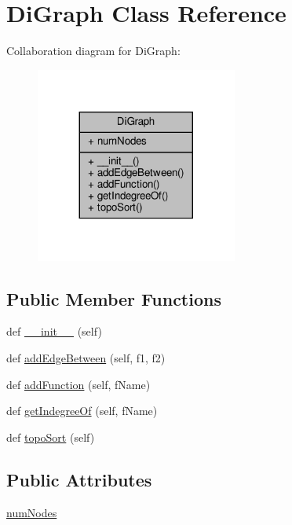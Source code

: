 \hypertarget{classDiGraph_1_1DiGraph}{}\section{Di\+Graph Class Reference}
\label{classDiGraph_1_1DiGraph}


Collaboration diagram for Di\+Graph\+:\nopagebreak
\begin{figure}[H]
\begin{center}
\leavevmode
\includegraphics[width=188pt]{classDiGraph_1_1DiGraph__coll__graph}
\end{center}
\end{figure}
\subsection*{Public Member Functions}
\begin{DoxyCompactItemize}
\item 
def \hyperlink{classDiGraph_1_1DiGraph_ae64f0875afe3067b97ba370b354b9213}{\+\_\+\+\_\+init\+\_\+\+\_\+} (self)
\item 
def \hyperlink{classDiGraph_1_1DiGraph_ab064bb6af6f4d1916413e2ab9ef9cdb4}{add\+Edge\+Between} (self, f1, f2)
\item 
def \hyperlink{classDiGraph_1_1DiGraph_a9e00e5549f827c5cbba05adaa49d7e57}{add\+Function} (self, f\+Name)
\item 
def \hyperlink{classDiGraph_1_1DiGraph_a02f36c0ebca9e0e4fab9591c7d43130b}{get\+Indegree\+Of} (self, f\+Name)
\item 
def \hyperlink{classDiGraph_1_1DiGraph_ab37be01195a3d4a4cb7c992114e93219}{topo\+Sort} (self)
\end{DoxyCompactItemize}
\subsection*{Public Attributes}
\begin{DoxyCompactItemize}
\item 
\hyperlink{classDiGraph_1_1DiGraph_af9bd6d4d8ecd1b0563241fd648435e14}{num\+Nodes}
\end{DoxyCompactItemize}


